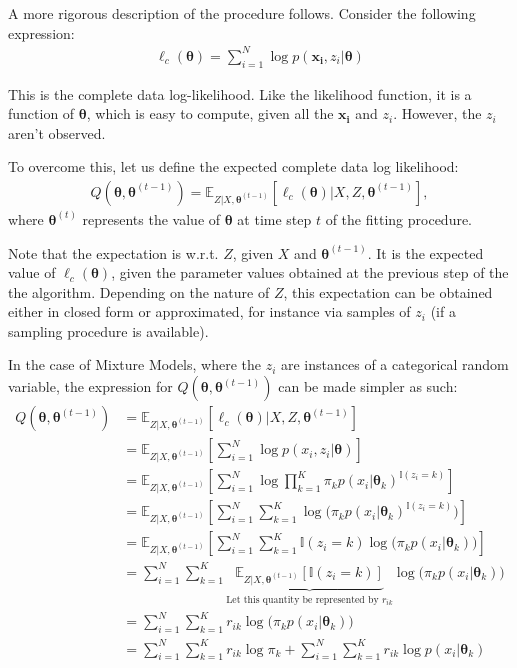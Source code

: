 A more rigorous description of the procedure follows. Consider the following
expression:
\begin{align}
    \ell_c(\bm{\theta}) = \sum^N_{i=1} \log p(\bm{x_i}, z_i | \bm{\theta})
\end{align}

This is the complete data log-likelihood. Like the likelihood function, it is a
function of $\bm{\theta}$, which is easy to compute, given all the $\bm{x_i}$ and $z_i$.
However, the $z_i$ aren't observed.

To overcome this, let us define the expected complete data log likelihood:
\begin{align}
    Q(\bm{\theta}, \bm{\theta}^{(t-1)}) = \mathbb{E}_{Z|X, \bm{\theta}^{(t-1)}}[\ell_c(\bm{\theta}) | X, Z, \bm{\theta}^{(t-1)}],
\end{align} where $\bm{\theta}^{(t)}$ represents the value of $\bm{\theta}$ at time step
$t$ of the fitting procedure.

Note that the expectation is w.r.t. $Z$, given $X$ and $\bm{\theta}^{(t-1)}$. It is the
expected value of $\ell_c(\bm{\theta})$, given the parameter values obtained at the
previous step of the the algorithm. Depending on the nature of $Z$, this expectation
can be obtained either in closed form or approximated, for instance via samples
of $z_i$ (if a sampling procedure is available).

In the case of Mixture Models, where the $z_i$ are instances of a categorical
random variable, the expression for $Q(\bm{\theta}, \bm{\theta}^{(t-1)})$ can be made
simpler as such:
\begin{align}
    Q(\bm{\theta}, \bm{\theta}^{(t-1)}) &= \mathbb{E}_{Z|X, \bm{\theta}^{(t-1)}}[\ell_c(\bm{\theta}) | X, Z, \bm{\theta}^{(t-1)}] \\
    &= \mathbb{E}_{Z|X, \bm{\theta}^{(t-1)}}[\sum_{i=1}^N \log p(x_i, z_i | \bm{\theta})] \\
    &= \mathbb{E}_{Z|X, \bm{\theta}^{(t-1)}}[\sum_{i=1}^N \log \prod_{k=1}^K \pi_k p(x_i | \bm{\theta}_k)^{\mathbb{I}(z_i = k)}] \\
    &= \mathbb{E}_{Z|X, \bm{\theta}^{(t-1)}}[\sum_{i=1}^N \sum_{k=1}^K \log\Big(\pi_k p(x_i | \bm{\theta}_k)^{\mathbb{I}(z_i = k)}\Big)] \\
    &= \mathbb{E}_{Z|X, \bm{\theta}^{(t-1)}}[\sum_{i=1}^N \sum_{k=1}^K \mathbb{I}(z_i = k) \log\Big(\pi_k p(x_i | \bm{\theta}_k)\Big)] \\
    &= \sum_{i=1}^N \sum_{k=1}^K \underbrace{\mathbb{E}_{Z|X, \bm{\theta}^{(t-1)}}[\mathbb{I}(z_i = k)]}_{\text{Let this quantity be represented by $r_{ik}$}} \log\Big(\pi_k p(x_i | \bm{\theta}_k)\Big)\\
    &= \sum_{i=1}^N \sum_{k=1}^K r_{ik} \log\Big(\pi_k p(x_i | \bm{\theta}_k)\Big) \\
    &= \sum_{i=1}^N \sum_{k=1}^K r_{ik} \log\pi_k + \sum_{i=1}^N \sum_{k=1}^K r_{ik} \log p(x_i | \bm{\theta}_k) \\
\end{align}

